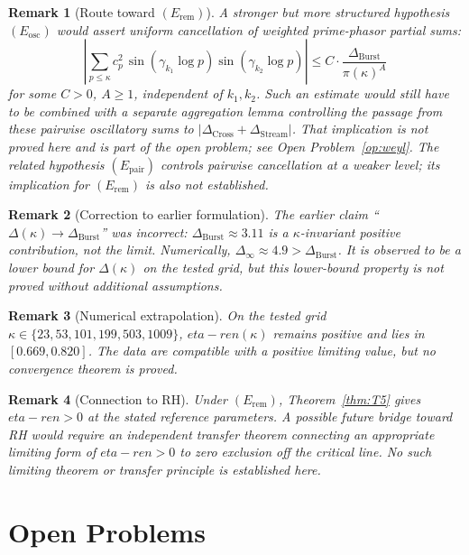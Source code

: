 \documentclass[11pt]{article}
\def\etaren{eta-ren}%
\newtheorem*{remark}{Remark}
\newcommand{\etaren}{\eta_{\mathrm{ren}}}
\newcommand{\Dburstvar}{\Delta_{\mathrm{Burst}}}
\newcommand{\Dcross}{\Delta_{\mathrm{Cross}}}
\newcommand{\Dstream}{\Delta_{\mathrm{Stream}}}
\begin{document}
\begin{remark}[Route toward $(E_{\mathrm{rem}})$]
A stronger but more structured hypothesis $(E_{\mathrm{osc}})$ would
assert uniform cancellation of weighted prime-phasor partial sums:
\[
\left|\sum_{p\le\kappa} c_p^2\,
      \sin(\gamma_{k_1}\log p)\sin(\gamma_{k_2}\log p)
\right| \le C\cdot\frac{\Dburstvar}{\pi(\kappa)^A}
\]
for some $C>0$, $A\ge 1$, independent of $k_1,k_2$.
Such an estimate would still have to be combined
with a separate aggregation lemma controlling the
passage from these pairwise oscillatory sums to
$|\Dcross+\Dstream|$.
That implication is not proved here and is part
of the open problem; see Open Problem~\ref{op:weyl}.
The related hypothesis $(E_{\mathrm{pair}})$ controls pairwise
cancellation at a weaker level; its implication for $(E_{\mathrm{rem}})$
is also not established.
\end{remark}

\begin{remark}[Correction to earlier formulation]
The earlier claim ``$\Delta(\kappa)\to\Dburstvar$'' was incorrect:
$\Dburstvar \approx 3.11$ is a $\kappa$-invariant positive contribution,
not the limit. Numerically, $\Delta_\infty \approx 4.9 > \Dburstvar$.
It is observed to be a lower bound for $\Delta(\kappa)$ on the tested grid,
but this lower-bound property is not proved without additional assumptions.
\end{remark}

\begin{remark}[Numerical extrapolation]
On the tested grid $\kappa\in\{23,53,101,199,503,1009\}$, $\etaren(\kappa)$
remains positive and lies in $[0.669, 0.820]$. The data are compatible with a positive limiting value,
but no convergence theorem is proved.
\end{remark}

\begin{remark}[Connection to RH]
Under $(E_{\mathrm{rem}})$, Theorem~\ref{thm:T5} gives $\etaren>0$
at the stated reference parameters.
A possible future bridge toward RH would require an independent
transfer theorem connecting an appropriate limiting form of
$\etaren>0$ to zero exclusion off the critical line.
No such limiting theorem or transfer principle is established here.
\end{remark}

\section{Open Problems}\label{sec:open-problems}
\end{document}
